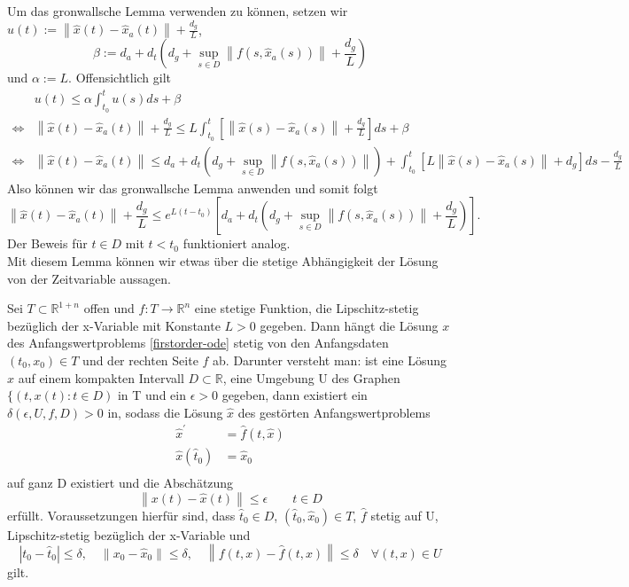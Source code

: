 Um das gronwallsche Lemma verwenden zu können, setzen wir
$u(t):=\left\lVert \hat{x}(t) - \hat{x}_a(t)\right\rVert + \frac{d_g}{L}$,
\[
    \beta:=d_a + d_t(d_g + \sup_{s\in D}\left\lVert f(s,\hat{x}_a(s)) \right\rVert + \frac{d_g}{L})
\] und $\alpha:=L$.
Offensichtlich gilt
\begin{align*}
    &u(t) \leq \alpha \int_{t_0}^{t} u(s) ds + \beta\\
    \Leftrightarrow & \left\lVert \hat{x}(t) - \hat{x}_a(t)\right\rVert + \frac{d_g}{L} \leq
    L \int_{t_0}^{t} \left[\left\lVert \hat{x}(s) - \hat{x}_a(s)\right\rVert + \frac{d_g}{L}\right] ds + \beta \\
    \Leftrightarrow & \left\lVert \hat{x}(t) - \hat{x}_a(t)\right\rVert \leq
    d_a + d_t(d_g + \sup_{s\in D}\left\lVert f(s,\hat{x}_a(s)) \right\rVert) +
    \int_{t_0}^{t} \left[ L \left\lVert \hat{x}(s) - \hat{x}_a(s) \right\rVert + d_g \right] ds - \frac{d_g}{L}
\end{align*}
Also können wir das gronwallsche Lemma anwenden und somit folgt
\[
    \left\lVert \hat{x}(t) - \hat{x}_a(t)\right\rVert + \frac{d_g}{L} \leq
    e^{L(t-t_0)}\left[d_a + d_t(d_g + \sup_{s\in D}\left\lVert f(s,\hat{x}_a(s)) \right\rVert + \frac{d_g}{L})\right].
\]
Der Beweis für $t \in D$ mit $t<t_0$ funktioniert analog. \qedwhite\\
Mit diesem Lemma können wir etwas über die stetige Abhängigkeit der Lösung von der Zeitvariable aussagen.
\begin{satz}
    \label{Satz-stet-abh}
    Sei $T \subset \mathbb{R}^{1+n}$ offen und $f:T \rightarrow \mathbb{R}^{n}$ eine stetige Funktion, die
    Lipschitz-stetig bezüglich der x-Variable mit Konstante $L>0$ gegeben. Dann hängt die Lösung $x$ des
    Anfangswertproblems \eqref{firstorder-ode} stetig von den Anfangsdaten $(t_0, x_0) \in T$ und der rechten Seite $f$ ab.
    Darunter versteht man:
    ist eine Lösung $x$ auf einem kompakten Intervall $D \subset \mathbb{R}$, eine Umgebung U des Graphen
    $\{(t,x(t): t \in D)$ in T und ein $\epsilon>0$ gegeben, dann existiert ein $\delta(\epsilon, U, f, D) >0$ in,
    sodass die Lösung $\hat{x}$ des gestörten Anfangswertproblems
    \begin{align*}
        \hat{x}^{\prime} &= \hat{f}(t,\hat{x})\\
        \hat{x}(\hat{t}_0) &= \hat{x}_0 \\
    \end{align*}
    auf ganz D existiert und die Abschätzung
    \[
        \left\lVert x(t) - \hat{x}(t) \right\rVert \leq \epsilon \qquad t \in D
    \]
    erfüllt. Voraussetzungen hierfür sind, dass $\hat{t}_0 \in D$, $(\hat{t}_0, \hat{x}_0) \in T$, $\hat{f}$ stetig auf
    U, Lipschitz-stetig bezüglich der x-Variable und
    \[
        |t_0 - \hat{t}_0| \leq \delta, \quad \left\lVert x_0 - \hat{x}_0 \right\rVert \leq \delta, \quad
        \left\lVert f(t,x) - \hat{f}(t,x) \right\rVert \leq \delta \quad \forall (t,x) \in U
    \] gilt.
\end{satz}
